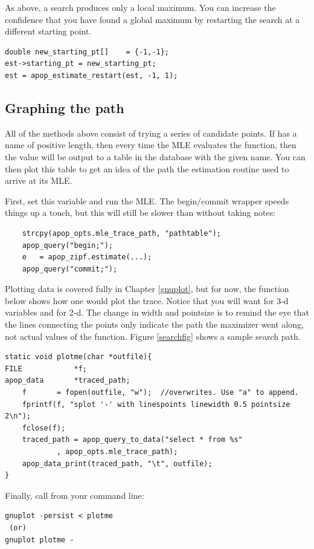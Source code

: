 As above, a search produces only a local maximum. You can increase the
confidence that you have found a global maximum by restarting the search
at a different starting point. 
\begin{lstlisting}
double new_starting_pt[]    = {-1,-1};
est->starting_pt = new_starting_pt;
est = apop_estimate_restart(est, -1, 1);
\end{lstlisting}

\subsection{Graphing the path} All of the methods above consist of
trying a series of candidate points. 
If 
has a name of positive
length, then every time the MLE evaluates the function, then the value
will be output to a table in the database with the given name. You can
then plot this table to get an idea of the path the estimation routine
used to arrive at its MLE.

First, set this variable and run the MLE. The begin/commit wrapper
speeds things up a touch, but this will still be slower than without
taking notes:
\begin{lstlisting}
    strcpy(apop_opts.mle_trace_path, "pathtable");
    apop_query("begin;");
    e   = apop_zipf.estimate(...);
    apop_query("commit;");
\end{lstlisting}
Plotting data is covered fully in Chapter \ref{gnuplot}, but for now,
the function below shows how one would plot the trace.  Notice that
you will want  for 3-d variables and  for
2-d. The change in width and pointsize is to remind the eye that the
lines connecting the points only indicate the path the maximizer went
along, not actual values of the function. Figure \ref{searchfig} shows a
sample search path.

\begin{lstlisting}
static void plotme(char *outfile){
FILE            *f;
apop_data       *traced_path;
    f       = fopen(outfile, "w");  //overwrites. Use "a" to append.
    fprintf(f, "splot '-' with linespoints linewidth 0.5 pointsize 2\n");
    fclose(f);
    traced_path = apop_query_to_data("select * from %s"
            , apop_opts.mle_trace_path);
    apop_data_print(traced_path, "\t", outfile);
}
\end{lstlisting}

Finally, call  from your command line:
\begin{lstlisting}
gnuplot -persist < plotme
 (or)
gnuplot plotme -
\end{lstlisting}

